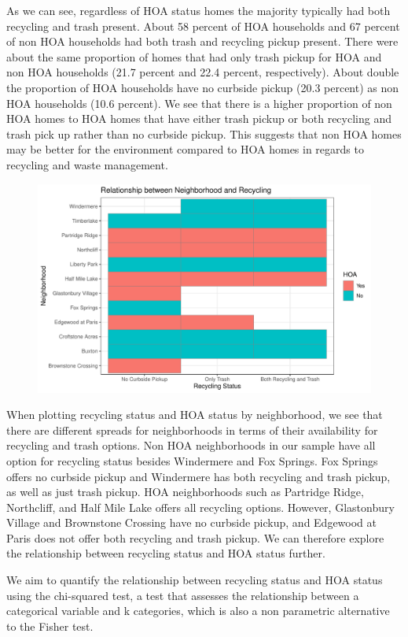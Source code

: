 \documentclass{article}
\begin{document}
As we can see, regardless of HOA status homes the majority typically had both recycling and trash present. About 58 percent of HOA households and 67 percent of non HOA households had both trash and recycling pickup present. There were about the same proportion of homes that had only trash pickup for HOA and non HOA households (21.7 percent and 22.4 percent, respectively). About double the proportion of HOA households have no curbside pickup (20.3 percent) as non HOA households (10.6 percent). We see that there is a higher proportion of non HOA homes to HOA homes that have either trash pickup or both recycling and trash pick up rather than no curbside pickup. This suggests that non HOA homes may be better for the environment compared to HOA homes in regards to recycling and waste management.
\begin{figure}[H]
		\centering
\includegraphics{exam23-011}
		\label{Fig:plot3}
	\end{figure}
When plotting recycling status and HOA status by neighborhood, we see that there are different spreads for neighborhoods in terms of their availability for recycling and trash options. Non HOA neighborhoods in our sample have all option for recycling status besides Windermere and Fox Springs. Fox Springs offers no curbside pickup and Windermere has both recycling and trash pickup, as well as just trash pickup. HOA neighborhoods such as Partridge Ridge, Northcliff, and Half Mile Lake offers all recycling options. However, Glastonbury Village and Brownstone Crossing have no curbside pickup, and Edgewood at Paris does not offer both recycling and trash pickup. We can therefore explore the relationship between recycling status and HOA status further. 

We aim to quantify the relationship between recycling status and HOA status using the chi-squared test, a test that assesses the relationship between a categorical variable and k categories, which is also a non parametric alternative to the Fisher test.
\end{document}
